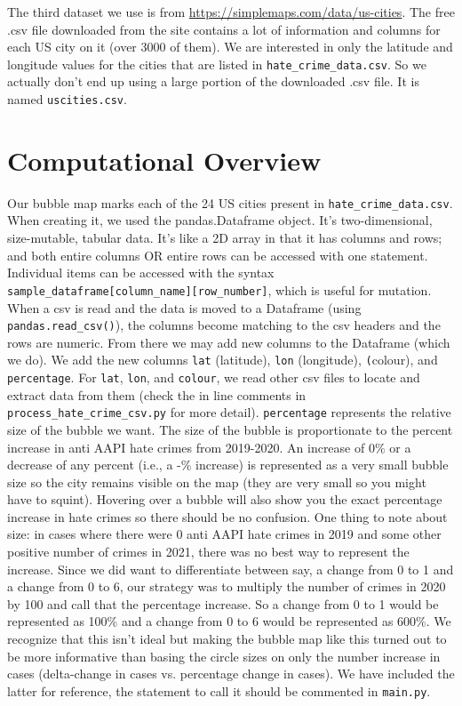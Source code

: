 \documentclass[fontsize=11pt]{article}
\begin{document}
    The third dataset we use is from
    \url{https://simplemaps.com/data/us-cities}. The free .csv file downloaded from the site contains a lot of information and columns for each US city on it (over 3000 of them). We are interested in only the latitude and longitude values for the cities that are listed in \texttt{hate\_crime\_data.csv}. So we actually don't end up using a large portion of the downloaded .csv file. It is named \texttt{uscities.csv}.

\section*{Computational Overview}

    \quad Our bubble map marks each of the 24 US cities present in \texttt{hate\_crime\_data.csv}. When creating it, we used the pandas.Dataframe object. It's two-dimensional, size-mutable, tabular data. It's like a 2D array in that it has columns and rows; and both entire columns OR entire rows can be accessed with one statement. Individual items can be accessed with the syntax \texttt{sample\_dataframe[column\_name][row\_number]}, which is useful for mutation. When a csv is read and the data is moved to a Dataframe (using \texttt{pandas.read\_csv()}), the columns become matching to the csv headers and the rows are numeric. From there we may add new columns to the Dataframe (which we do). We add the new columns \texttt{lat} (latitude), \texttt{lon} (longitude), \texttt(colour), and \texttt{percentage}. For \texttt{lat}, \texttt{lon}, and \texttt{colour}, we read other csv files to locate and extract data from them (check the in line comments in \texttt{process\_hate\_crime\_csv.py} for more detail). \texttt{percentage} represents the relative size of the bubble we want. The size of the bubble is proportionate to the percent increase in anti AAPI hate crimes from 2019-2020. An increase of 0\% or a decrease of any percent (i.e., a -\% increase) is represented as a very small bubble size so the city remains visible on the map (they are very small so you might have to squint). Hovering over a bubble will also show you the exact percentage increase in hate crimes so there should be no confusion. One thing to note about size: in cases where there were 0 anti AAPI hate crimes in 2019 and some other positive number of crimes in 2021, there was no best way to represent the increase. Since we did want to differentiate between say, a change from 0 to 1 and a change from 0 to 6, our strategy was to multiply the number of crimes in 2020 by 100 and call that the percentage increase. So a change from 0 to 1 would be represented as 100\% and a change from 0 to 6 would be represented as 600\%. We recognize that this isn't ideal but making the bubble map like this turned out to be more informative than basing the circle sizes on only the number increase in cases (delta-change in cases vs. percentage change in cases). We have included the latter for reference, the statement to call it should be commented in \texttt{main.py}.
\end{document}
